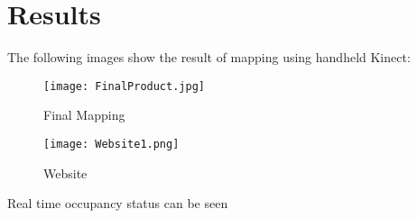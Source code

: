 \chapter{Results}
The following images show the result of mapping using handheld Kinect:

\begin{figure}[ht]
\begin{center}

\texttt{[image: FinalProduct.jpg]}

\caption{Final Mapping}

\label{fig:Final}
\end{center}
\end{figure}


\newpage 

\begin{figure}[ht]
\begin{center}

\texttt{[image: Website1.png]}
\caption{Website}

\label{fig:Site2}
\end{center}
\end{figure}

\par Real time occupancy status can be seen 


